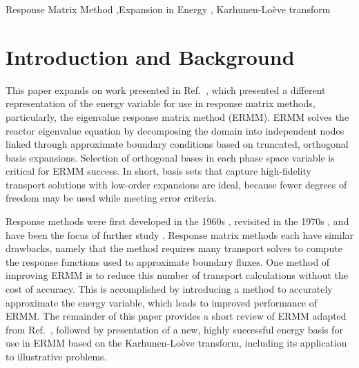 \documentclass[5p,times,twocolumn,10pt]{elsarticle}
\newcommand{\REF}[1]{Ref.~\citen{#1}}               %
\begin{document}
\begin{frontmatter}
        \begin{keyword}
            Response Matrix Method \sep Expansion in Energy \sep
            Karhunen-Lo\`{e}ve transform



        \end{keyword}

    \end{frontmatter}


    \section{Introduction and Background}
    \label{Introduction}

    This paper expands on work presented in \REF{annualANS}, which
    presented a different representation of the energy variable for use in
    response matrix methods, particularly, the eigenvalue response matrix
    method (ERMM). ERMM solves the reactor eigenvalue equation by decomposing
    the domain into independent nodes linked through approximate boundary
    conditions based on truncated, orthogonal basis expansions. Selection of
    orthogonal bases in each phase space variable is critical for ERMM success.
    In short, basis sets that capture high-fidelity transport solutions with
    low-order expansions are ideal, because fewer degrees of freedom may be
    used while meeting error criteria.

    Response methods were first developed in the 1960s \cite{shimizu,
shimizu_et_all}, revisited in the     1970s \cite{Lindahl, Weiss1975}, and
have been the focus of further study \cite{RobertsSerment,
Mosher2006}.  Response matrix methods each have
    similar drawbacks, namely that the method requires many transport solves to
    compute the response functions used to approximate boundary fluxes.  One
    method of improving ERMM is to reduce this number of transport calculations
    without the cost of accuracy. This is accomplished by introducing a method
    to accurately approximate the energy variable, which leads to improved
    performance of ERMM. The remainder of this paper provides a short review of
    ERMM adapted from \REF{RobertsSerment}, followed by presentation of a new,
    highly successful energy basis for use in ERMM based on the
    Karhunen-Lo\`{e}ve transform, including its application to
    illustrative problems.
\end{document}
